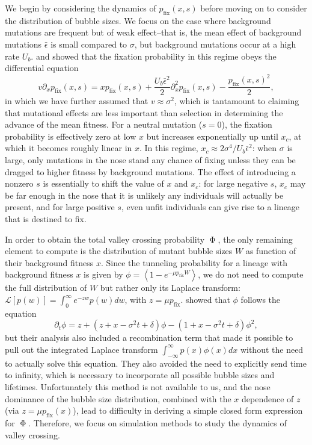 \documentclass[10pt,twocolumn,twoside]{gsajnl}
\newcommand{\pfix}{p_{\mathrm{fix}}}
\begin{document}
\begin{spacing}{1.5}
We begin by considering the dynamics of $\pfix(x,s)$ before moving on to consider the distribution of bubble sizes.
We focus on the case where background mutations are frequent but of weak effect--that is, the mean effect of background mutations $\bar{\epsilon}$ is small compared to $\sigma$, but background mutations occur at a high rate $U_b$.
\citet{hallatschek_2011} and \citet{good_2014} showed that the fixation probability in this regime obeys the differential equation 
\begin{equation}
v\partial_x \pfix(x,s) = x \pfix(x,s) + \frac{U_b\bar{\epsilon}^2}{2}\partial_x^2 \pfix(x,s) - \frac{\pfix(x,s)^2}{2},
\end{equation}
in which we have further assumed that $v \approx \sigma^2$, which is tantamount to claiming that mutational effects are less important than selection in determining the advance of the mean fitness.
For a neutral mutation ($s = 0$), the fixation probability is effectively zero at low $x$ but increases exponentially up until $x_c$, at which it becomes roughly linear in $x$.
In this regime, $x_c \approx 2\sigma^4/U_b\bar{\epsilon}^2$: when $\sigma$ is large, only mutations in the nose stand any chance of fixing unless they can be dragged to higher fitness by background mutations.
The effect of introducing a nonzero $s$ is essentially to shift the value of $x$ and $x_c$: for large negative $s$, $x_c$ may be far enough in the nose that it is unlikely any individuals will actually be present, and for large positive $s$, even unfit individuals can give rise to a lineage that is destined to fix.

In order to obtain the total valley crossing probability $\upPhi$, the only remaining element to compute is the distribution of mutant bubble sizes $W$ as function of their background fitness $x$.
Since the tunneling probability for a lineage with background fitness $x$ is given by $\phi = \left< 1 - e^{-\mu \pfix W} \right>$, we do not need to compute the full distribution of $W$ but rather only its Laplace transform: $\mathcal{L}\left[ p(w) \right] = \int_0^\infty e^{-zw} p(w) dw$, with $z = \mu \pfix$.
\citet{neher_shraiman_2011} showed that $\phi$ follows the equation
\begin{equation}
\partial_t \phi = z + (z + x - \sigma^2 t + \delta)\phi - (1 + x - \sigma^2 t + \delta)\phi^2,
\end{equation}
but their analysis also included a recombination term that made it possible to pull out the integrated Laplace transform $\int_{-\infty}^\infty p(x) \phi(x) dx$ without the need to actually solve this equation.
They also avoided the need to explicitly send time to infinity, which is necessary to incorporate all possible bubble sizes and lifetimes.
Unfortunately this method is not available to us, and the nose dominance of the bubble size distribution, combined with the $x$ dependence of $z$ (via $z = \mu \pfix(x)$), lead to difficulty in deriving a simple closed form expression for $\upPhi$.
Therefore, we focus on simulation methods to study the dynamics of valley crossing.


\end{spacing}
\end{document}
